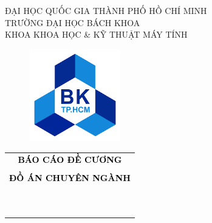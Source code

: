 \documentclass[a4paper]{article}
\begin{document}
\begin{titlepage}
	\begin{center}
		ĐẠI HỌC QUỐC GIA THÀNH PHỐ HỒ CHÍ MINH \\
		TRƯỜNG ĐẠI HỌC BÁCH KHOA \\
		KHOA KHOA HỌC \& KỸ THUẬT MÁY TÍNH
	\end{center}
	\renewcommand{\rmdefault}{ppl}
	\vspace{1cm}
	\begin{figure}[h!]
		\begin{center}
			\includegraphics[width=4cm, height=4cm]{Pictures/logoBK.png}
		\end{center}
	\end{figure}
	\vspace{1cm}

	\begin{center}
		\begin{tabular}{c}
			\textbf{\large\textcolor{black}{BÁO CÁO ĐỀ CƯƠNG}}                         \\\\
			\textbf{\large\textcolor{black}{ĐỒ ÁN CHUYÊN NGÀNH}}                       \\\\
			~~                                                                         \\
			\hline
			\\
			\textbf{\large \color{black}{Phát triển và mở rộng}}                         \\
			\textbf{\large \color{black}{nền tảng đánh giá quy trình nghiệp vụ tự động}} \\
			\\
			\hline
		\end{tabular}
	\end{center}
	\vspace{2cm}


\end{titlepage}
\end{document}
